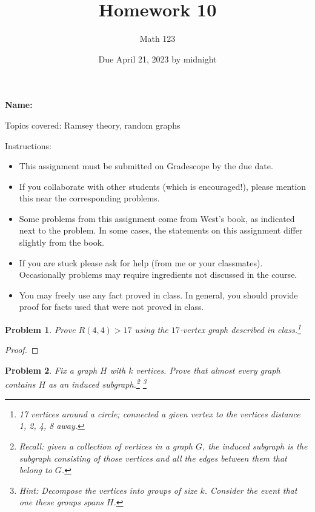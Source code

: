 \documentclass[11pt]{article}
\author{Math 123}
\date{Due April 21, 2023 by midnight}
\title{Homework 10}
\newtheorem{problem}{Problem}
\begin{document}
\maketitle

{\bf\Large Name:} 


\vspace{.3in}
Topics covered: Ramsey theory, random graphs

Instructions: 
\begin{itemize}
\item This assignment must be submitted on Gradescope by the due date. 
\item If you collaborate with other students (which is encouraged!), please mention this near the corresponding problems. 
\item Some problems from this assignment come from West's book, as indicated next to the problem. In some cases, the statements on this assignment differ slightly from the book. 
\item If you are stuck please ask for help (from me or your classmates). Occasionally problems may require ingredients not discussed in the course. 
\item You may freely use any fact proved in class. In general, you should provide proof for facts used that were not proved in class. 
\end{itemize}

\pagebreak 

\begin{problem}
Prove $R(4,4)>17$ using the $17$-vertex graph described in class.\footnote{17 vertices around a circle; connected a given vertex to the vertices distance 1, 2, 4, 8 away.}
\end{problem}

\begin{proof}

\end{proof}

\pagebreak

\begin{problem}
Fix a graph $H$ with $k$ vertices. Prove that almost every graph contains $H$ as an induced subgraph.\footnote{Recall: given a collection of vertices in a graph $G$, the induced subgraph is the subgraph consisting of those vertices and all the edges between them that belong to $G$.} \footnote{Hint: Decompose the vertices into groups of size $k$. Consider the event that one these groups spans $H$.}
\end{problem}
\end{document}
